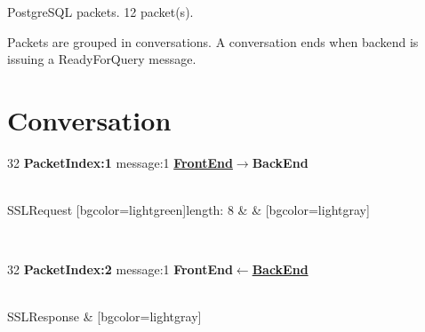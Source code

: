 \documentclass{article}
\begin{document}
    
PostgreSQL packets. 12 packet(s).

Packets are grouped in conversations.
A conversation ends when backend is issuing a ReadyForQuery message.

\section{Conversation}


	\vspace{1cm}

	\begin{bytefield}[boxformatting={\centering\small}, bitheight=8ex]{32}
		\textbf{PacketIndex:1} message:1 \textbf{\underline{FrontEnd}$\longrightarrow$BackEnd}\\
		 \\
	

\begin{leftwordgroup}{SSLRequest}
        [bgcolor=lightgreen]{length: 8} &
         &
        [bgcolor=lightgray]{}
    \end{leftwordgroup}
    \vspace{1pt} \\
\end{bytefield}

	\vspace{1cm}

	\begin{bytefield}[boxformatting={\centering\small}, bitheight=8ex]{32}
		\textbf{PacketIndex:2} message:1 \textbf{FrontEnd$\longleftarrow$\underline{BackEnd}}\\
		 \\
	

\begin{leftwordgroup}{SSLResponse}
         &
        [bgcolor=lightgray]{}
    \end{leftwordgroup}
    \vspace{1pt} \\
\end{bytefield}

	\vspace{1cm}
\end{document}
